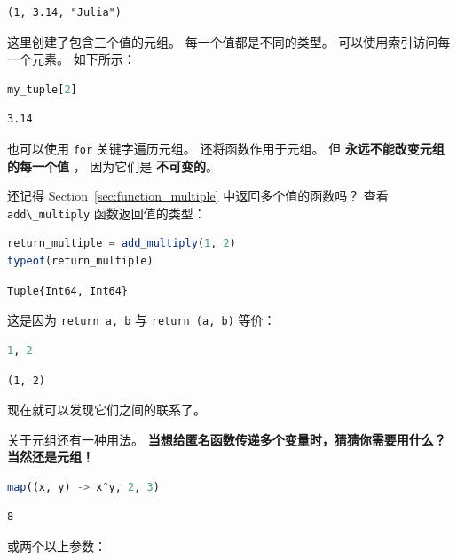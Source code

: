\documentclass[
  notoc %
]{tufte-book}
\newcommand{\passthrough}[1]{#1}
\begin{document}
\begin{lstlisting}[language=Output]
(1, 3.14, "Julia")
\end{lstlisting}

这里创建了包含三个值的元组。 每一个值都是不同的类型。
可以使用索引访问每一个元素。 如下所示：

\begin{lstlisting}[language=Julia]
my_tuple[2]
\end{lstlisting}

\begin{lstlisting}[language=Output]
3.14
\end{lstlisting}

也可以使用 \passthrough{\lstinline!for!} 关键字遍历元组。
还将函数作用于元组。 但 \textbf{永远不能改变元组的每一个值} ，
因为它们是 \textbf{不可变的}。

还记得 Section~\ref{sec:function_multiple} 中返回多个值的函数吗？ 查看
\passthrough{\lstinline!add\_multiply!} 函数返回值的类型：

\begin{lstlisting}[language=Julia]
return_multiple = add_multiply(1, 2)
typeof(return_multiple)
\end{lstlisting}

\begin{lstlisting}[language=Output]
Tuple{Int64, Int64}
\end{lstlisting}

这是因为 \passthrough{\lstinline!return a, b!} 与
\passthrough{\lstinline!return (a, b)!} 等价：

\begin{lstlisting}[language=Julia]
1, 2
\end{lstlisting}

\begin{lstlisting}[language=Output]
(1, 2)
\end{lstlisting}

现在就可以发现它们之间的联系了。

关于元组还有一种用法。
\textbf{当想给匿名函数传递多个变量时，猜猜你需要用什么？ 当然还是元组！}

\begin{lstlisting}[language=Julia]
map((x, y) -> x^y, 2, 3)
\end{lstlisting}

\begin{lstlisting}[language=Output]
8
\end{lstlisting}

或两个以上参数：
\end{document}
